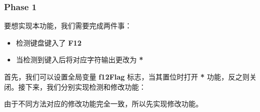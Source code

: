         \subsubsection{Phase 1}
            \par 要想实现本功能，我们需要完成两件事：
            \begin{itemize}
                \item 检测键盘键入了 \textbf{F12}
                \item 当检测到键入后将对应字符输出更改为 \textbf{*}
            \end{itemize}
            \par 首先，我们可以设置全局变量 \textbf{f12Flag} 标志，当其置位时打开 \textbf{*} 功能，反之则关闭。接下来，我们分别实现检测和修改功能：
            \par 由于不同方法对应的修改功能完全一致，所以先实现修改功能。
